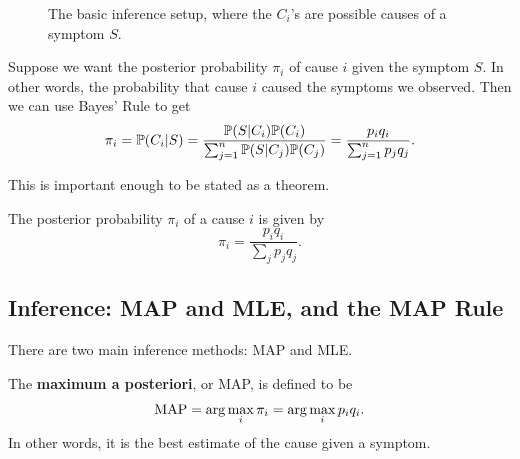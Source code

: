 \documentclass[11 pt]{scrartcl}
\begin{document}
\begin{figure}[!htb]
    \centering
{}
\caption{The basic inference setup, where the $C_i$'s are possible causes of a symptom $S$.}
\label{fig:map}
\end{figure}

Suppose we want the posterior probability $\pi_i$ of cause $i$ given the symptom $S$. In other words, the probability that cause $i$ caused the symptoms we observed. Then we can use Bayes' Rule to get 
\[ \pi_i  = \mathbb P(C_i | S) = \dfrac{\mathbb P(S | C_i) \mathbb P(C_i)}{\sum_{j=1}^n \mathbb P(S|C_j)\mathbb P(C_j)} = \dfrac{p_iq_i}{\sum_{j=1}^n p_jq_j}. \]

This is important enough to be stated as a theorem. 

\begin{theorem}
    The posterior probability $\pi_i$ of a cause $i$ is given by 
    \[ \pi_i = \dfrac{p_iq_i}{\sum_j p_j q_j}.\] 
\end{theorem}

\subsection{Inference: MAP and MLE, and the MAP Rule}
There are two main inference methods: MAP and MLE. 

\begin{definition}[MAP]
    The \textbf{maximum a posteriori}, or MAP, is defined to be 
    \[ \text{MAP} = \arg\max_i \pi_i = \arg\max_i p_iq_i.\]  
    In other words, it is the best estimate of the cause given a symptom. 
\end{definition}
\end{document}
